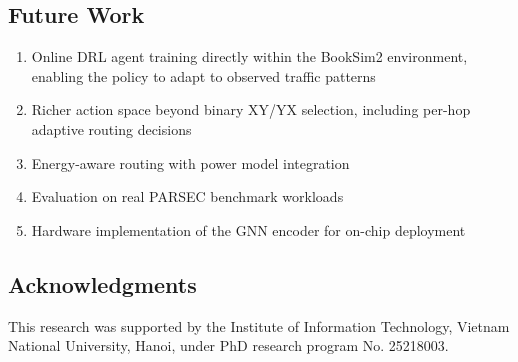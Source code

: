 \subsection*{Future Work}
\begin{enumerate}
    \item Online DRL agent training directly within the BookSim2 environment, enabling the policy to adapt to observed traffic patterns
    \item Richer action space beyond binary XY/YX selection, including per-hop adaptive routing decisions
    \item Energy-aware routing with power model integration
    \item Evaluation on real PARSEC benchmark workloads
    \item Hardware implementation of the GNN encoder for on-chip deployment
\end{enumerate}

\subsection*{Acknowledgments}
This research was supported by the Institute of Information Technology, Vietnam National University, Hanoi, under PhD research program No. 25218003.
